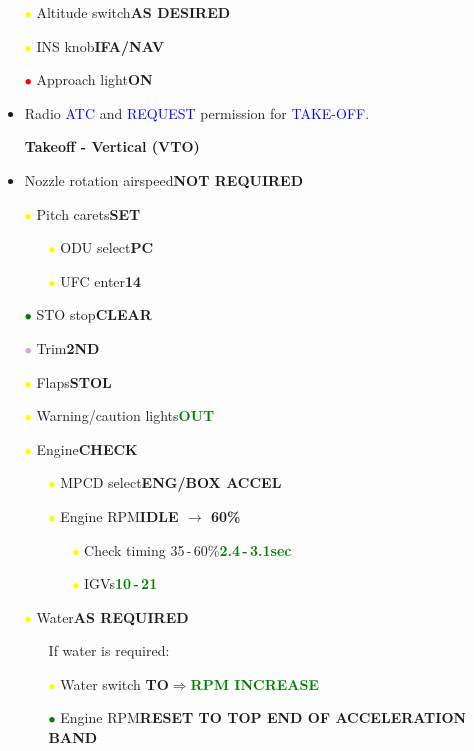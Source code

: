 \documentclass[a4paper,12pt,dvipsnames]{letter}
\newcommand{\radio}[1]{\textcolor{blue}{#1}}
\newcommand{\button}[1]{\textbf{#1}}
\newcommand{\Deg}{\textdegree{}}
\newcommand{\ok}[1]{\textcolor{Green}{\textbf{#1}}}
\newcommand{\ri}{\textcolor{red}{$\bullet$\;}}
\newcommand{\gi}{\textcolor{Green}{$\bullet$\;}}
\newcommand{\yi}{\textcolor{Yellow}{$\bullet$\;}}
\newcommand{\vi}{\textcolor{Plum}{$\bullet$\;}}
\begin{document}
{\begin{itemize}
\item[\yi] Altitude switch\dotfill\button{AS DESIRED}
\item[\yi] INS knob\dotfill\button{IFA/NAV}
\item[\ri] Approach light\dotfill\button{ON}
\item Radio \radio{ATC} and \radio{REQUEST} permission for \radio{TAKE-OFF}.
\end{itemize}
\newpage
\begin{itemize}
\item[] {\LARGE\textbf{Takeoff - Vertical (VTO)}}
\item Nozzle rotation airspeed\dotfill\button{NOT REQUIRED}
\item[\yi] Pitch carets\dotfill\button{SET}
\begin{itemize}
 \item[\yi] ODU select\dotfill\button{PC}
 \item[\yi] UFC enter\dotfill\button{14}
\end{itemize}
\item[\gi] STO stop\dotfill\button{CLEAR}
\item[\vi] Trim\dotfill\button{2\Deg\;ND}
\item[\yi] Flaps\dotfill\button{STOL}
\item[\yi] Warning/caution lights\dotfill\ok{OUT}
\item[\yi] Engine\dotfill\button{CHECK}
\begin{itemize}
 \item[\yi] MPCD select\dotfill\button{ENG/BOX ACCEL}
 \item[\yi] Engine RPM\dotfill\button{IDLE $\rightarrow$ 60\%}
 \begin{itemize}
  \item[\yi] Check timing 35\,-\,60\%\dotfill\ok{2.4\,-\,3.1\;sec}
  \item[\yi] IGVs\dotfill\ok{10\Deg\,-\,21\Deg}	
 \end{itemize}
\end{itemize}
\item[\yi] Water\dotfill\button{AS REQUIRED}
\begin{itemize}
 \item[] If water is required:
 \item[\yi] Water switch \dotfill\button{TO}\;$\Rightarrow$\;\ok{RPM INCREASE}
 \item[\gi] Engine RPM\dotfill\button{RESET TO TOP END OF ACCELERATION BAND}

\end{itemize}
\end{itemize}}
\end{document}
